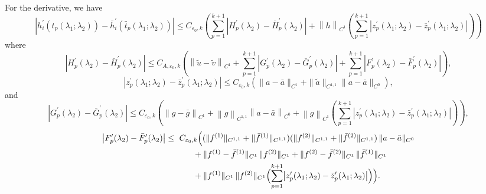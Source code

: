 \documentclass[a4paper,reqno,11pt]{amsart}
\numberwithin{equation}{section} %
\begin{document}
For the derivative, we have
$$
\left| h_{i}^{\prime}\left( t_p\left( \lambda _1;\lambda _2 \right) \right) -\bar{h}_{i}^{\prime}\left( \bar{t}_p\left( \lambda _1;\lambda _2 \right) \right) \right|\leq C_{\varepsilon _0,k}\left( \sum_{p=1}^{k+1}{\left| H_{p}^{\prime}\left( \lambda _2 \right) -\bar{H}_{p}^{\prime}\left( \lambda _2 \right) \right|}+\left\| h \right\| _{C^1}\left( \sum_{p=1}^{k+1}{\left| z_{p}^{\prime}\left( \lambda _1;\lambda _2 \right) -\bar{z}_{p}^{\prime}\left( \lambda _1;\lambda _2 \right) \right|} \right) \right) 
$$
where
$$
\left| H_{p}^{\prime}\left( \lambda _2 \right) -\bar{H}_{p}^{\prime}\left( \lambda _2 \right) \right|\le C_{A,\varepsilon _0,k}\left( \left\| \tilde{u}-\tilde{v} \right\| _{C^1}+\sum_{p=1}^{k+1}{\left| G_{p}^{\prime}\left( \lambda _2 \right) -\bar{G}_{p}^{\prime}\left( \lambda _2 \right) \right|}+\sum_{p=1}^{k+1}{\left| F_{p}^{\prime}\left( \lambda _2 \right) -\bar{F}_{p}^{\prime}\left( \lambda _2 \right) \right|} \right) ,
$$
$$
\left| z_{p}^{\prime}\left( \lambda _1;\lambda _2 \right) -\bar{z}_{p}^{\prime}\left( \lambda _1;\lambda _2 \right) \right|\le C_{\varepsilon _0,k}\left( \parallel a-\bar{a}\parallel _{C^1}+\parallel \tilde{a}\parallel _{C^{1,1}}\parallel a-\bar{a}\parallel _{C^0} \right) ,
$$
and
$$
\left| G_{p}^{\prime}\left( \lambda _2 \right) -\bar{G}_{p}^{\prime}\left( \lambda _2 \right) \right|\le C_{\varepsilon _0,k}\left( \left\| g-\bar{g} \right\| _{C^1}+\left\| g \right\| _{C^{1,1}}\left\| a-\bar{a} \right\| _{C^0}+\left\| g \right\| _{C^1}\left( \sum_{p=1}^{k+1}{\left| z_{p}^{\prime}\left( \lambda _1;\lambda _2 \right) -\bar{z}_{p}^{\prime}\left( \lambda _1;\lambda _2 \right) \right|} \right) \right) ,
$$
\[
\begin{aligned}
\bigl|F'_p(\lambda_2)-\bar F'_p(\lambda_2)\bigr|
\le{}&\ C_{\varepsilon_0,k}\Bigl(
  (\|f^{(1)}\|_{C^{1,1}}+\|\bar f^{(1)}\|_{C^{1,1}})
  (\|f^{(2)}\|_{C^{1,1}}+\|\bar f^{(2)}\|_{C^{1,1}})\,\|a-\bar a\|_{C^{0}} \\
&\qquad + \|f^{(1)}-\bar f^{(1)}\|_{C^{1}}\,\|f^{(2)}\|_{C^{1}}
  + \|f^{(2)}-\bar f^{(2)}\|_{C^{1}}\,\|\bar f^{(1)}\|_{C^{1}} \\
&\qquad + \|f^{(1)}\|_{C^{1}}\,\|f^{(2)}\|_{C^{1}}
   \Bigl(\sum_{p=1}^{k+1}\bigl|z'_p(\lambda_1;\lambda_2)-\bar z'_p(\lambda_1;\lambda_2)\bigr|\Bigr)
\Bigr).
\end{aligned}
\]
\end{document}

